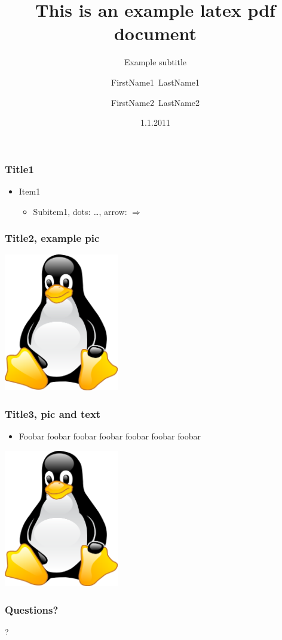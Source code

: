 \documentclass[utf8]{beamer}
\title{This is an example latex pdf document}
\subtitle{Example subtitle}
\author{
    FirstName1~LastName1
    \and
    FirstName2~LastName2
}
\date{1.1.2011}
\begin{document}
\begin{frame}[plain]
\titlepage
\end{frame}


\begin{frame}
\frametitle{Title1}
    \begin{itemize}
        \item Item1
        \begin{itemize}
            \item Subitem1, dots: \ldots, arrow: $\Rightarrow$
        \end{itemize}
    \end{itemize}
\end{frame}


\begin{frame}
\frametitle{Title2, example pic}
\begin{center}
    \includegraphics[height=6cm]{img/example.png}
\end{center}
\end{frame}


\begin{frame}
\frametitle{Title3, pic and text}
    \begin{itemize}
        \item Foobar foobar foobar  foobar  foobar  foobar  foobar 
    \end{itemize}
\begin{center}
    \includegraphics[height=6cm]{img/example.png}
\end{center}
\end{frame}


\begin{frame}
\frametitle{Questions?}
\begin{center}
\fontsize{80}{80}\selectfont ?
\end{center}
\end{frame}
\end{document}
